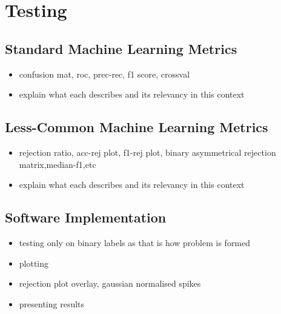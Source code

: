\section{Testing}
\label{sec:pl-test}

    \subsection{Standard Machine Learning Metrics}
    \label{subsec:pl-test-stan}
        \begin{itemize}
            \item{confusion mat, roc, prec-rec, f1 score, crossval}
            \item{explain what each describes and its relevancy in this context}
        \end{itemize}
        
    \subsection{Less-Common Machine Learning Metrics}
    \label{subsec:pl-test-less}
        \begin{itemize}
            \item{rejection ratio, acc-rej plot, f1-rej plot, binary asymmetrical rejection matrix,median-f1,etc}
            \item{explain what each describes and its relevancy in this context}
        \end{itemize}
    
    \subsection{Software Implementation}
    \label{subsec:pl-test-software}
        \begin{itemize}
            \item{testing only on binary labels as that is how problem is formed}
            \item{plotting}
            \item{rejection plot overlay, gaussian normalised spikes}
            \item{presenting results}
        \end{itemize}